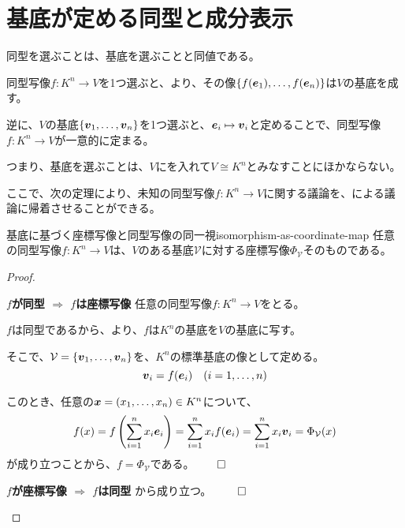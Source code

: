 \documentclass[../../../topic_linear-algebra]{subfiles}
\begin{document}
\sectionline
\section{基底が定める同型と成分表示}

同型を選ぶことは、基底を選ぶことと同値である。

\br

同型写像$f\colon K^n \to V$を1つ選ぶと、より、その像$\{ f(\vb*{e}_1), \ldots, f(\vb*{e}_n) \}$は$V$の基底を成す。

逆に、$V$の基底$\{ \vb*{v}_1, \ldots, \vb*{v}_n \}$を1つ選ぶと、$\vb*{e}_i \mapsto \vb*{v}_i$と定めることで、同型写像$f\colon K^n \to V$が一意的に定まる。

\br

つまり、基底を選ぶことは、$V$にを入れて$V \cong K^n$とみなすことにほかならない。

\br

ここで、次の定理により、未知の同型写像$f\colon K^n \to V$に関する議論を、による議論に帰着させることができる。

\begin{theorem}{基底に基づく座標写像と同型写像の同一視}{isomorphism-as-coordinate-map}
  任意の同型写像$f\colon K^n \to V$は、$V$のある基底$\mathcal{V}$に対する座標写像$\Phi_{\mathcal{V}}$そのものである。
\end{theorem}

\begin{proof}
  \begin{subpattern}{\bfseries $f$が同型 $\Longrightarrow$ $f$は座標写像}
    任意の同型写像$f\colon K^n \to V$をとる。
    
    $f$は同型であるから、より、$f$は$K^n$の基底を$V$の基底に写す。
    
    そこで、$\mathcal{V} = \{ \vb*{v}_1, \ldots, \vb*{v}_n \}$を、$K^n$の標準基底の像として定める。
    \begin{equation*}
      \vb*{v}_i = f(\vb*{e}_i) \quad (i=1,\dots,n)
    \end{equation*}
    
    このとき、任意の$\vb*{x} = (x_1,\dots,x_n) \in K^n$について、
    \begin{equation*}
      f(x) = f\left( \sum_{i=1}^n x_i \vb*{e}_i \right) = \sum_{i=1}^n x_i f(\vb*{e}_i) = \sum_{i=1}^n x_i \vb*{v}_i = \Phi_{\mathcal{V}}(x)
    \end{equation*}
    が成り立つことから、$f = \Phi_{\mathcal{V}}$である。$\qed$
  \end{subpattern}

  \begin{subpattern}{\bfseries $f$が座標写像 $\Longrightarrow$ $f$は同型}
    から成り立つ。 $\qed$
  \end{subpattern}
\end{proof}
\end{document}
